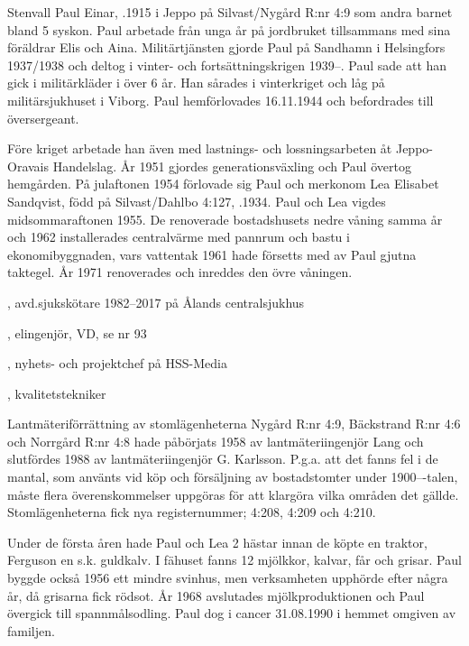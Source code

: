 %
Stenvall Paul Einar, .1915 i Jeppo på Silvast/Nygård R:nr 4:9 som andra barnet bland 5 syskon. Paul arbetade från unga år på jordbruket tillsammans med sina föräldrar Elis och Aina. Militärtjänsten gjorde Paul på Sandhamn i Helsingfors 1937/1938 och deltog i vinter- och fortsättningskrigen 1939--. Paul sade att han gick i militärkläder i över 6 år. Han sårades i vinterkriget och låg på militärsjukhuset i Viborg. Paul hemförlovades 16.11.1944 och befordrades till översergeant.

Före kriget arbetade han även med lastnings- och lossningsarbeten åt Jeppo-Oravais Handelslag. År 1951 gjordes generationsväxling och Paul övertog hemgården. På julaftonen 1954 förlovade sig Paul och merkonom Lea Elisabet Sandqvist, född på Silvast/Dahlbo 4:127, .1934. Paul och Lea vigdes midsommaraftonen 1955. De renoverade bostadshusets nedre våning samma år och 1962 installerades centralvärme med pannrum och bastu i ekonomibyggnaden, vars vattentak 1961 hade försetts med av Paul gjutna taktegel. År 1971 renoverades och inreddes den övre våningen.
\begin{jhchildren}
  \item {},	avd.sjukskötare 1982--2017 på Ålands centralsjukhus
  \item {}, elingenjör, VD, se nr 93
  \item {}, nyhets- och projektchef på HSS-Media
  \item {}, kvalitetstekniker
\end{jhchildren}
Lantmäteriförrättning av stomlägenheterna Nygård R:nr 4:9,  Bäckstrand R:nr 4:6 och Norrgård R:nr 4:8 hade påbörjats 1958 av lantmäteriingenjör Lang och slutfördes 1988 av lantmäteriingenjör G. Karlsson. P.g.a. att det fanns fel i de mantal, som använts vid köp och försäljning av bostadstomter under 1900---talen, måste flera överenskommelser uppgöras för att klargöra vilka områden det gällde. Stomlägenheterna fick nya registernummer; 4:208, 4:209 och 4:210.

Under de första åren hade Paul och Lea 2 hästar innan de köpte en traktor, Ferguson en s.k. guldkalv. I fähuset fanns 12 mjölkkor, kalvar, får och grisar. Paul byggde också 1956 ett mindre svinhus, men verksamheten upphörde efter några år, då grisarna fick rödsot. År 1968 avslutades mjölkproduktionen och Paul övergick till spannmålsodling. Paul dog i cancer 31.08.1990 i hemmet omgiven av familjen.

